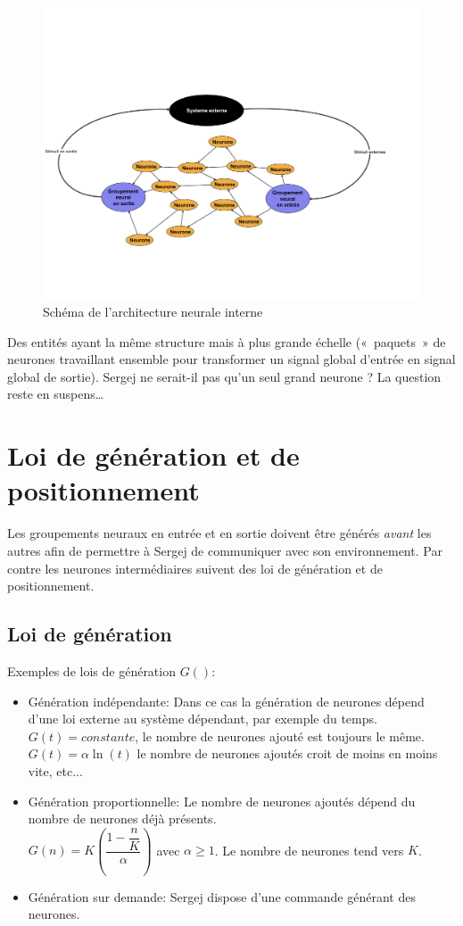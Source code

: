 \documentclass[a4paper,10pt]{article}
\newcommand{\guill}[1]{«~#1~»}
\theoremstyle{definition}
\theoremstyle{remark}
\theoremstyle{plain}
\begin{document}
\begin{figure}
\centering
\includegraphics[scale=0.5]{Groupement_neural}
\caption{Schéma de l'architecture neurale interne}
\end{figure}

Des entités ayant la même structure mais à plus grande échelle (\guill{paquets} de neurones travaillant ensemble pour transformer un signal global d'entrée en signal global de sortie). Sergej ne serait-il pas qu'un seul grand neurone ? La question reste en suspens\dots

\section{Loi de génération et de positionnement}

Les groupements neuraux en entrée et en sortie doivent être générés \textit{avant} les autres afin de permettre à Sergej de communiquer avec son environnement. Par contre les neurones intermédiaires suivent des loi de génération et de positionnement.
\subsection{Loi de génération}
Exemples de lois de génération $G()$:
\begin{itemize}
\item Génération indépendante: Dans ce cas la génération de neurones dépend d'une loi externe au système dépendant, par exemple du temps. \\$G(t)=constante$, le nombre de neurones ajouté est toujours le même.\\
 $G(t)=\alpha\ln (t)$ le nombre de neurones ajoutés croit de moins en moins vite, etc...
\item Génération proportionnelle: Le nombre de neurones ajoutés dépend du nombre de neurones déjà présents.\\ $G(n) = K\left(\dfrac{1-\dfrac{n}{K}}{\alpha}\right)$ avec $\alpha\geq1$. Le nombre de neurones tend vers $K$.\\
\item Génération sur demande: Sergej dispose d'une commande générant des neurones.
\end{itemize}
\end{document}
